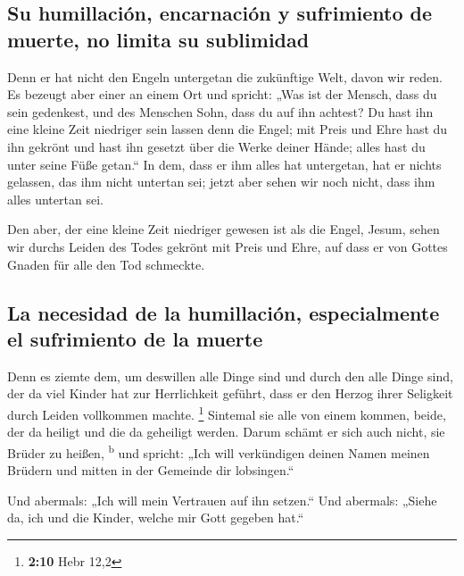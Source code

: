 \hypertarget{su-humillaciuxf3n-encarnaciuxf3n-y-sufrimiento-de-muerte-no-limita-su-sublimidad}{%
\subsection{Su humillación, encarnación y sufrimiento de muerte, no
limita su
sublimidad}\label{su-humillaciuxf3n-encarnaciuxf3n-y-sufrimiento-de-muerte-no-limita-su-sublimidad}}

 Denn er hat nicht den Engeln untergetan die zukünftige
Welt, davon wir reden.  Es bezeugt aber einer an einem Ort
und spricht: „Was ist der Mensch, dass du sein gedenkest, und des
Menschen Sohn, dass du auf ihn achtest?  Du hast ihn eine
kleine Zeit niedriger sein lassen denn die Engel; mit Preis und Ehre
hast du ihn gekrönt und hast ihn gesetzt über die Werke deiner Hände;
 alles hast du unter seine Füße getan.`` In dem, dass er
ihm alles hat untergetan, hat er nichts gelassen, das ihm nicht untertan
sei; jetzt aber sehen wir noch nicht, dass ihm alles untertan sei.

 Den aber, der eine kleine Zeit niedriger gewesen ist als
die Engel, Jesum, sehen wir durchs Leiden des Todes gekrönt mit Preis
und Ehre, auf dass er von Gottes Gnaden für alle den Tod schmeckte.

\hypertarget{la-necesidad-de-la-humillaciuxf3n-especialmente-el-sufrimiento-de-la-muerte}{%
\subsection{La necesidad de la humillación, especialmente el sufrimiento
de la
muerte}\label{la-necesidad-de-la-humillaciuxf3n-especialmente-el-sufrimiento-de-la-muerte}}

 Denn es ziemte dem, um deswillen alle Dinge sind und
durch den alle Dinge sind, der da viel Kinder hat zur Herrlichkeit
geführt, dass er den Herzog ihrer Seligkeit durch Leiden vollkommen
machte. \footnote{\textbf{2:10} Hebr 12,2}  Sintemal sie
alle von einem kommen, beide, der da heiligt und die da geheiligt
werden. Darum schämt er sich auch nicht, sie Brüder zu heißen,
\textsuperscript{b}  und spricht: „Ich will verkündigen
deinen Namen meinen Brüdern und mitten in der Gemeinde dir lobsingen.``

 Und abermals: „Ich will mein Vertrauen auf ihn setzen.``
Und abermals: „Siehe da, ich und die Kinder, welche mir Gott gegeben
hat.``

